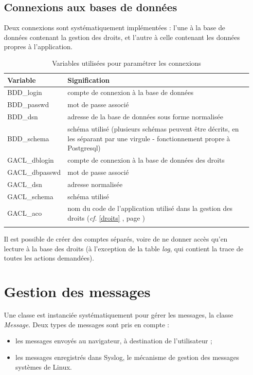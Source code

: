 \subsection{Connexions aux bases de données}

Deux connexions sont systématiquement implémentées : l'une à la base de données contenant la gestion des droits, et l'autre à celle contenant les données propres à l'application.
\begin{longtable}{|p{5cm}|p{8cm}|}
\hline
\textbf{Variable} & \textbf{Signification} \\
\hline
\endhead
BDD\_login & compte de connexion à la base de données \\
\hline
BDD\_passwd & mot de passe associé\\
\hline
BDD\_dsn & adresse de la base de données sous forme normalisée\\
\hline
BDD\_schema & schéma utilisé (plusieurs schémas peuvent être décrits, en les séparant par une virgule - fonctionnement propre à Postgresql)\\
\hline
GACL\_dblogin & compte de connexion à la base de données des droits\\
\hline
GACL\_dbpasswd & mot de passe associé\\
\hline
GACL\_dsn & adresse normalisée \\
\hline
GACL\_schema & schéma utilisé\\
\hline
GACL\_aco & nom du code de l'application utilisé dans la gestion des droits (\textit{cf.} \ref{droits} \textit{\nameref{droits}}, page \pageref{droits} )\\
\hline


\caption{Variables utilisées pour paramétrer les connexions}
\end{longtable}

Il est possible de créer des comptes séparés, voire de ne donner accès qu'en lecture à la base des droits (à l'exception de la table \textit{log}, qui contient la trace de toutes les actions demandées).

\section{Gestion des messages}

Une classe est instanciée systématiquement pour gérer les messages, la classe \textit{Message}. Deux types de messages sont pris en compte :
\begin{itemize}
\item les messages envoyés au navigateur, à destination de l'utilisateur ;
\item les messages enregistrés dans Syslog, le mécanisme de gestion des messages systèmes de Linux.
\end{itemize}

